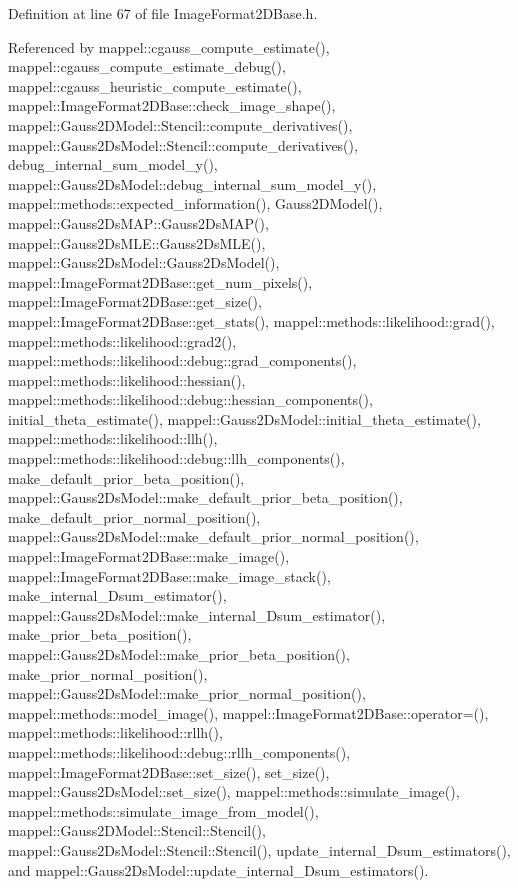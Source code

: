 Definition at line 67 of file Image\+Format2\+D\+Base.\+h.



Referenced by mappel\+::cgauss\+\_\+compute\+\_\+estimate(), mappel\+::cgauss\+\_\+compute\+\_\+estimate\+\_\+debug(), mappel\+::cgauss\+\_\+heuristic\+\_\+compute\+\_\+estimate(), mappel\+::\+Image\+Format2\+D\+Base\+::check\+\_\+image\+\_\+shape(), mappel\+::\+Gauss2\+D\+Model\+::\+Stencil\+::compute\+\_\+derivatives(), mappel\+::\+Gauss2\+Ds\+Model\+::\+Stencil\+::compute\+\_\+derivatives(), debug\+\_\+internal\+\_\+sum\+\_\+model\+\_\+y(), mappel\+::\+Gauss2\+Ds\+Model\+::debug\+\_\+internal\+\_\+sum\+\_\+model\+\_\+y(), mappel\+::methods\+::expected\+\_\+information(), Gauss2\+D\+Model(), mappel\+::\+Gauss2\+Ds\+M\+A\+P\+::\+Gauss2\+Ds\+M\+A\+P(), mappel\+::\+Gauss2\+Ds\+M\+L\+E\+::\+Gauss2\+Ds\+M\+L\+E(), mappel\+::\+Gauss2\+Ds\+Model\+::\+Gauss2\+Ds\+Model(), mappel\+::\+Image\+Format2\+D\+Base\+::get\+\_\+num\+\_\+pixels(), mappel\+::\+Image\+Format2\+D\+Base\+::get\+\_\+size(), mappel\+::\+Image\+Format2\+D\+Base\+::get\+\_\+stats(), mappel\+::methods\+::likelihood\+::grad(), mappel\+::methods\+::likelihood\+::grad2(), mappel\+::methods\+::likelihood\+::debug\+::grad\+\_\+components(), mappel\+::methods\+::likelihood\+::hessian(), mappel\+::methods\+::likelihood\+::debug\+::hessian\+\_\+components(), initial\+\_\+theta\+\_\+estimate(), mappel\+::\+Gauss2\+Ds\+Model\+::initial\+\_\+theta\+\_\+estimate(), mappel\+::methods\+::likelihood\+::llh(), mappel\+::methods\+::likelihood\+::debug\+::llh\+\_\+components(), make\+\_\+default\+\_\+prior\+\_\+beta\+\_\+position(), mappel\+::\+Gauss2\+Ds\+Model\+::make\+\_\+default\+\_\+prior\+\_\+beta\+\_\+position(), make\+\_\+default\+\_\+prior\+\_\+normal\+\_\+position(), mappel\+::\+Gauss2\+Ds\+Model\+::make\+\_\+default\+\_\+prior\+\_\+normal\+\_\+position(), mappel\+::\+Image\+Format2\+D\+Base\+::make\+\_\+image(), mappel\+::\+Image\+Format2\+D\+Base\+::make\+\_\+image\+\_\+stack(), make\+\_\+internal\+\_\+Dsum\+\_\+estimator(), mappel\+::\+Gauss2\+Ds\+Model\+::make\+\_\+internal\+\_\+Dsum\+\_\+estimator(), make\+\_\+prior\+\_\+beta\+\_\+position(), mappel\+::\+Gauss2\+Ds\+Model\+::make\+\_\+prior\+\_\+beta\+\_\+position(), make\+\_\+prior\+\_\+normal\+\_\+position(), mappel\+::\+Gauss2\+Ds\+Model\+::make\+\_\+prior\+\_\+normal\+\_\+position(), mappel\+::methods\+::model\+\_\+image(), mappel\+::\+Image\+Format2\+D\+Base\+::operator=(), mappel\+::methods\+::likelihood\+::rllh(), mappel\+::methods\+::likelihood\+::debug\+::rllh\+\_\+components(), mappel\+::\+Image\+Format2\+D\+Base\+::set\+\_\+size(), set\+\_\+size(), mappel\+::\+Gauss2\+Ds\+Model\+::set\+\_\+size(), mappel\+::methods\+::simulate\+\_\+image(), mappel\+::methods\+::simulate\+\_\+image\+\_\+from\+\_\+model(), mappel\+::\+Gauss2\+D\+Model\+::\+Stencil\+::\+Stencil(), mappel\+::\+Gauss2\+Ds\+Model\+::\+Stencil\+::\+Stencil(), update\+\_\+internal\+\_\+Dsum\+\_\+estimators(), and mappel\+::\+Gauss2\+Ds\+Model\+::update\+\_\+internal\+\_\+Dsum\+\_\+estimators().

